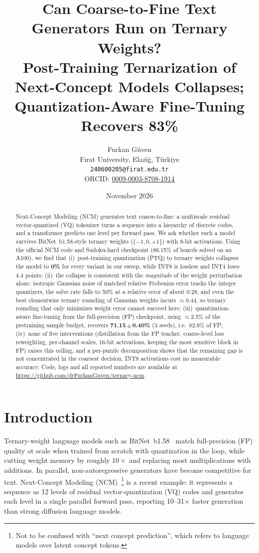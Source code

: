 \documentclass[11pt]{article}
\title{Can Coarse-to-Fine Text Generators Run on Ternary Weights?\\
\large Post-Training Ternarization of Next-Concept Models Collapses; Quantization-Aware Fine-Tuning Recovers 83\%}
\author{Furkan G\"uven\\F\i rat University, Elaz\u{\i}\u{g}, T\"urkiye\\\texttt{240600205@firat.edu.tr}\\ORCID: \href{https://orcid.org/0009-0003-8708-1914}{0009-0003-8708-1914}}
\date{November 2026}
\begin{document}
\maketitle

\begin{abstract}
Next-Concept Modeling (NCM) generates text coarse-to-fine: a multiscale residual vector-quantized (VQ) tokenizer
turns a sequence into a hierarchy of discrete codes, and a transformer predicts one level per forward pass. We ask
whether such a model survives BitNet~b1.58-style ternary weights ($\{-1,0,+1\}$) with 8-bit activations. Using the
official NCM code and Sudoku-hard checkpoint (86.15\% of boards solved on an A100), we find that
(i)~post-training quantization (PTQ) to ternary weights collapses the model to \textbf{0\%} for every variant in our
sweep, while INT8 is lossless and INT4 loses 4.4 points;
(ii)~the collapse is consistent with the \emph{magnitude} of the weight perturbation alone: isotropic Gaussian
noise of matched relative Frobenius error tracks the integer quantizers, the solve rate falls to 50\% at a relative
error of about 0.28, and even the best elementwise ternary rounding of Gaussian weights incurs $\approx$0.44, so
ternary rounding that only minimizes weight error cannot succeed here;
(iii)~quantization-aware fine-tuning from the full-precision (FP) checkpoint, using $\approx$2.5\% of the
pretraining sample budget, recovers \textbf{71.15\,$\pm$\,0.40\%} (3 seeds), i.e.\ 82.6\% of FP;
(iv)~none of five interventions (distillation from the FP teacher, coarse-level loss reweighting, per-channel
scales, 16-bit activations, keeping the most sensitive block in FP) raises this ceiling, and a per-puzzle
decomposition shows that the remaining gap is not concentrated in the coarsest decision. INT8 activations cost no
measurable accuracy. Code, logs and all reported numbers are available at
\url{https://github.com/drFurkanGuven/ternary-ncm}.
\end{abstract}

\section{Introduction}

Ternary-weight language models such as BitNet~b1.58~\citep{ma2024era,ma2025bitnet2b4t} match full-precision (FP)
quality at scale when trained from scratch with quantization in the loop, while cutting weight memory by roughly
$10\times$ and replacing most multiplications with additions. In parallel, non-autoregressive generators have
become competitive for text. Next-Concept Modeling (NCM)~\citep{kumbong2026ncm}\footnote{Not to be confused with ``next concept
prediction'', which refers to language models over latent concept tokens.} is a recent example: it
represents a sequence as 12 levels of residual vector-quantization (VQ) codes and generates each level in a single
parallel forward pass, reporting 10--31$\times$ faster generation than strong diffusion language models.
\end{document}
